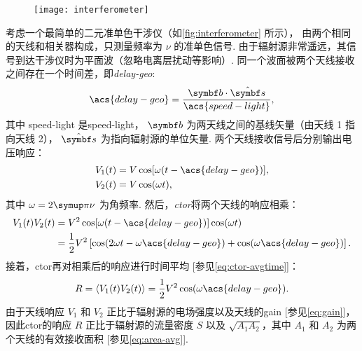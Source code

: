 \begin{figure}[htp]
  \centering
  \texttt{[image: interferometer]}
  \label{fig:interferometer}
\end{figure}

考虑一个最简单的二元准单色干涉仪（如\autoref{fig:interferometer} 所示），
由两个相同的天线和相关器构成，只测量频率为 $\nu$ 的准单色信号.
由于辐射源非常遥远，其信号到达干涉仪时为平面波（忽略电离层扰动等影响）.
同一个波面被两个天线接收之间存在一个时间差，即\emph{\acf{delay-geo}}:
\begin{equation}
  \acs{delay-geo} = \frac{\B{b} \cdot \hat{\B{s}}}{\acs{speed-light}},
\end{equation}
其中 \acs{speed-light} 是\acl{speed-light}，
$\B{b}$ 为两天线之间的基线矢量（由天线 1 指向天线 2），
$\hat{\B{s}}$ 为指向辐射源的单位矢量.
两个天线接收信号后分别输出电压响应：
\begin{align}
  V_1(t) &= V \cos [\omega (t - \acs{delay-geo})], \\
  V_2(t) &= V \cos (\omega t),
\end{align}
其中 $\omega = 2\Cpi\nu$ 为角频率.
然后，\emph{\acf{ctor}}将两个天线的响应相乘：
\begin{align}
  V_1(t) V_2(t)
    &= V^2 \cos [\omega (t - \acs{delay-geo})] \cos (\omega t) \\
    &= \frac{1}{2} V^2 \left[ \cos (2\omega t - \omega \acs{delay-geo})
      + \cos (\omega \acs{delay-geo}) \right].
\end{align}
接着，\ac{ctor}再对相乘后的响应进行时间平均 [参见\autoref{eq:ctor-avgtime}]：
\begin{equation}
  \label{eq:resp-corr}
  R = \langle V_1(t) V_2(t) \rangle
    = \frac{1}{2} V^2 \cos (\omega \acs{delay-geo}).
\end{equation}
由于天线响应 $V_1$ 和 $V_2$ 正比于辐射源的电场强度以及天线的\ac{gain}
[参见\autoref{eq:gain}]，
因此\ac{ctor}的响应 $R$ 正比于辐射源的流量密度 $S$
以及 $\sqrt{A_1 A_2}$，其中 $A_1$ 和 $A_2$ 为两个天线的有效接收面积
[参见\autoref{eq:area-avg}].

